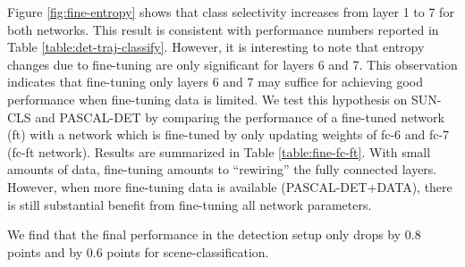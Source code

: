Figure \ref{fig:fine-entropy} shows that class selectivity increases from layer 1 to 7 for both networks.
This result is consistent with performance numbers reported in Table \ref{table:det-traj-classify}. 
However, it is interesting to note that entropy changes due to fine-tuning are only significant for layers 6 and 7. 
This observation indicates that fine-tuning only layers 6 and 7 may suffice for achieving good performance when fine-tuning data is limited. 
We test this hypothesis on SUN-CLS and PASCAL-DET by comparing the performance of a fine-tuned network (ft) with a network which is fine-tuned by only updating weights of fc-6 and fc-7 (fc-ft network). 
Results are summarized in Table \ref{table:fine-fc-ft}.
With small amounts of data, fine-tuning amounts to ``rewiring'' the fully connected layers.
However, when more fine-tuning data is available (PASCAL-DET+DATA), there is still substantial benefit from fine-tuning all network parameters.

\setlength{\tabcolsep}{2pt}
\begin{table}[t!]
\begin{center}
\caption{Comparison in performance on of Alex-Net, Finetuned Network(ft-net) and a network with only fc layers finetuned (fc-ft).}
\label{table:fine-effect}
\end{center}
\end{table}
\setlength{\tabcolsep}{1.4pt}

We find that the final performance in the detection setup only drops by 0.8 points and by 0.6 points for scene-classification.  

